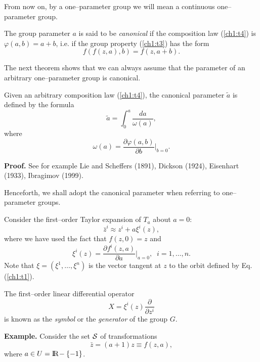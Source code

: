 From now on, by a one--parameter group we will mean  a continuous one--parameter
group.
\begin{defi}
\label{def2}
\begin{em}
The group parameter  $a$ is said to be {\em canonical} if the composition law
(\ref{ch1:t4}) is $\varphi (a,b)=a+b$, i.e. if the group property (\ref{ch1:t3})
has the form
\begin{equation}
\label{ch1:t5}
f(f(z,a),b)=f(z,a+b) .
\end{equation}
\end{em}
\end{defi}
The next theorem shows that we can always assume that the parameter of an
arbitrary one--parameter group is canonical.
\begin{theo}
\begin{em}
Given an arbitrary composition law (\ref{ch1:t4}), the canonical parameter $\tilde a$
is defined by the formula
\begin{equation}
\label{ch1:t6}
\tilde a=\int^a_0 \frac{da}{\omega (a)},
\end{equation}
where
\[\omega (a)=\frac{\partial \varphi (a,b)}{\partial b}|_{b=0}.\]
\end{em}
\end{theo}
{\bf Proof.} See for example Lie and Scheffers (1891), Dickson (1924),
Eisenhart (1933), Ibragimov (1999).

Henceforth, we shall adopt the canonical parameter when referring to
one--parameter groups. 

Consider the first--order Taylor expansion of $T_a$ about $a=0$:
\begin{equation}
\label{ch1:t7}
\bar z^i \approx z^i+a\xi^i (z),
\end{equation}
where we have used the fact that $ f(z,0)=z$ and
\begin{equation}
\label{ch1:t8}
\xi^i (z)=\frac{\partial f^i (z,a)}{\partial a}|_{a=0},\; \; i=1,\ldots,n.
\end{equation}
Note that $\xi=(\xi^1,\ldots,\xi^n)$ is the vector tangent at $z$
to the orbit defined by Eq. (\ref{ch1:t1}).
\begin{defi}
\label{def3}
\begin{em}
The first--order linear differential operator
\begin{equation}
\label{ch1:t9}
X=\xi^i (z)\frac{\partial}{\partial z^i}
\end{equation}
is known as the {\em symbol} or the {\em generator} of the group $G$.
\end{em}
\end{defi}
 {\bf Example.} Consider the set $\cal{S}$ of transformations
\[\bar z=(a+1)z\equiv f(z,a),\]
where $a\in U=\mathrm{I\!R\!}-\{-1\}$.

